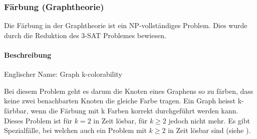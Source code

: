 	\subsubsection{Färbung (Graphtheorie)}\label{colarability_graph_theory}
	Die Färbung in der Graphtheorie ist ein NP-vollständiges Problem. Dies wurde durch die Reduktion des 3-SAT Problemes bewiesen.

	\paragraph{Beschreibung}
	Englischer Name: Graph k-colorability

	Bei diesem Problem geht es darum die Knoten eines Graphens so zu färben, dass keine zwei benachbarten Knoten die gleiche Farbe tragen. Ein Graph heisst k-färbbar, wenn die 
Färbung mit k Farben korrekt durchgeführt werden kann. Dieses Problem ist für $k = 2$ in  Zeit lösbar, für $k \ge 2$ jedoch nicht mehr. Es gibt Spezialfälle, 
bei welchen auch ein Problem mit $k \ge 2$ in  Zeit lösbar sind (siehe \cite{garey1979computers}).

